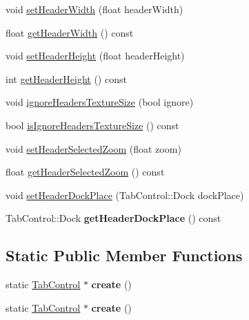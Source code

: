\textbf{ }\par
\begin{DoxyCompactItemize}
\item 
void \hyperlink{classui_1_1TabControl_a684dfc06887f10ff5dddb1085aab7dd4}{set\+Header\+Width} (float header\+Width)
\item 
float \hyperlink{classui_1_1TabControl_a077a40bfe4e7aee4a9026b166c45444e}{get\+Header\+Width} () const
\item 
void \hyperlink{classui_1_1TabControl_af24eae9f0c9d5613ccc4d28a37dc0f3a}{set\+Header\+Height} (float header\+Height)
\item 
int \hyperlink{classui_1_1TabControl_a289b60ebd1c8230753132f7bce2c94aa}{get\+Header\+Height} () const
\item 
void \hyperlink{classui_1_1TabControl_a5f4461d3c00405aedb662eaa5354e5ca}{ignore\+Headers\+Texture\+Size} (bool ignore)
\item 
bool \hyperlink{classui_1_1TabControl_ae5722ba3054173be0943311ee51fcebe}{is\+Ignore\+Headers\+Texture\+Size} () const
\item 
void \hyperlink{classui_1_1TabControl_ade6a8a4e54e5227c9e301fbb37967b96}{set\+Header\+Selected\+Zoom} (float zoom)
\item 
float \hyperlink{classui_1_1TabControl_a0b4d2d945e28d89fb7f071f46b161636}{get\+Header\+Selected\+Zoom} () const
\item 
void \hyperlink{classui_1_1TabControl_afd8f0b327792d7a5a91359c135459b4c}{set\+Header\+Dock\+Place} (Tab\+Control\+::\+Dock dock\+Place)
\item 
\mbox{\label{classui_1_1TabControl_af14da6ed88ba8e3fcdd436267ddc6927}} 
Tab\+Control\+::\+Dock {\bfseries get\+Header\+Dock\+Place} () const
\end{DoxyCompactItemize}

\subsection*{Static Public Member Functions}
\begin{DoxyCompactItemize}
\item 
\mbox{\label{classui_1_1TabControl_a4bdb7e419b6c4c2c23be4d1e00a12b70}} 
static \hyperlink{classui_1_1TabControl}{Tab\+Control} $\ast$ {\bfseries create} ()
\item 
\mbox{\label{classui_1_1TabControl_a5cbc3c05d8431f2a560e1383817f9445}} 
static \hyperlink{classui_1_1TabControl}{Tab\+Control} $\ast$ {\bfseries create} ()
\end{DoxyCompactItemize}
